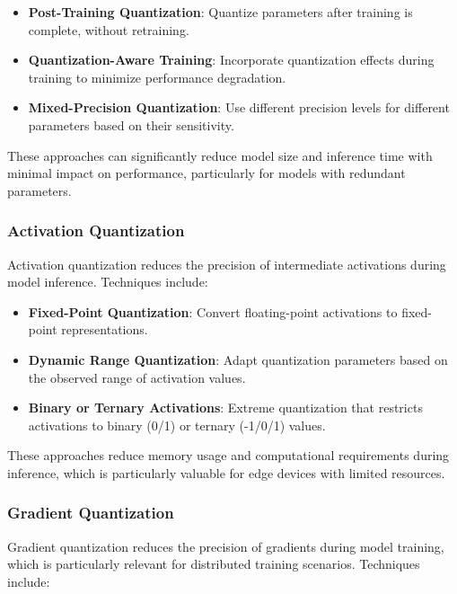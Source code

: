 \documentclass{article}
\begin{document}
\begin{itemize}
    \item \textbf{Post-Training Quantization}: Quantize parameters after training is complete, without retraining.
    
    \item \textbf{Quantization-Aware Training}: Incorporate quantization effects during training to minimize performance degradation.
    
    \item \textbf{Mixed-Precision Quantization}: Use different precision levels for different parameters based on their sensitivity.
\end{itemize}

These approaches can significantly reduce model size and inference time with minimal impact on performance, particularly for models with redundant parameters.

\subsubsection{Activation Quantization}

Activation quantization reduces the precision of intermediate activations during model inference. Techniques include:

\begin{itemize}
    \item \textbf{Fixed-Point Quantization}: Convert floating-point activations to fixed-point representations.
    
    \item \textbf{Dynamic Range Quantization}: Adapt quantization parameters based on the observed range of activation values.
    
    \item \textbf{Binary or Ternary Activations}: Extreme quantization that restricts activations to binary (0/1) or ternary (-1/0/1) values.
\end{itemize}

These approaches reduce memory usage and computational requirements during inference, which is particularly valuable for edge devices with limited resources.

\subsubsection{Gradient Quantization}

Gradient quantization reduces the precision of gradients during model training, which is particularly relevant for distributed training scenarios. Techniques include:
\end{document}

